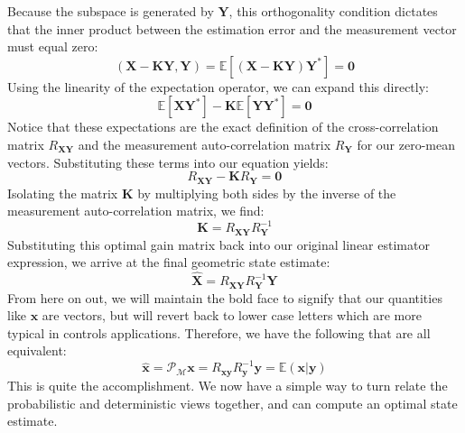 Because the subspace is generated by $\bm{Y}$, this orthogonality condition dictates that the inner product between the estimation error and the measurement vector must equal zero:
\begin{equation}
( \bm{X} - \bm{K}\bm{Y}, \bm{Y} ) = \mathbb{E}\left[ (\bm{X} - \bm{K}\bm{Y})\bm{Y}^* \right] = \bm{0}
\end{equation}
Using the linearity of the expectation operator, we can expand this directly:
\begin{equation}
\mathbb{E}[\bm{X}\bm{Y}^*] - \bm{K}\mathbb{E}[\bm{Y}\bm{Y}^*] = \bm{0}
\end{equation}
Notice that these expectations are the exact definition of the cross-correlation matrix ${R}_{\bm{X}\bm{Y}}$ and the measurement auto-correlation matrix ${R}_{\bm{Y}}$ for our zero-mean vectors. Substituting these terms into our equation yields:
\begin{equation}
{R}_{\bm{X}\bm{Y}} - \bm{K}{R}_{\bm{Y}} = \bm{0}
\end{equation}
Isolating the matrix $\bm{K}$ by multiplying both sides by the inverse of the measurement auto-correlation matrix, we find:
\begin{equation}
\bm{K} = {R}_{\bm{X}\bm{Y}} {R}_{\bm{Y}}^{-1}
\end{equation}
Substituting this optimal gain matrix back into our original linear estimator expression, we arrive at the final geometric state estimate:
\begin{equation}
\hat{\bm{X}} = {R}_{\bm{X}\bm{Y}} {R}_{\bm{Y}}^{-1} \bm{Y}
\end{equation}
From here on out, we will maintain the bold face to signify that our quantities like $\bm{x}$ are vectors, but will revert back to lower case letters which are more typical in controls applications. Therefore, we have the following that are all equivalent:
$$\bm{\hat{x}}=\mathcal{P}_\mathcal{M}\bm{x}=R_{\bm{xy}}R_{\bm{y}}^{-1}\bm{y}=\mathbb{E}(\bm{x}|\bm{y})$$
This is quite the accomplishment. We now have a simple way to turn relate the probabilistic and deterministic views together, and can compute an optimal state estimate.


